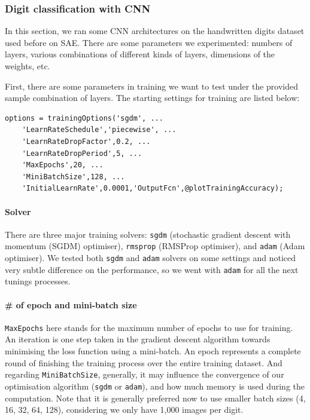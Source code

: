 \documentclass{article}
\begin{document}
\subsubsection{Digit classification with CNN}

In this section, we ran some CNN architectures on the handwritten digits dataset used before on SAE. There are some parameters we experimented: numbers of layers, various combinations of different kinds of layers, dimensions of the weights, etc.

First, there are some parameters in training we want to test under the provided sample combination of layers. The starting settings for training are listed below:

\begin{verbatim}
options = trainingOptions('sgdm', ...
    'LearnRateSchedule','piecewise', ...
    'LearnRateDropFactor',0.2, ...
    'LearnRateDropPeriod',5, ...
    'MaxEpochs',20, ...
    'MiniBatchSize',128, ...
    'InitialLearnRate',0.0001,'OutputFcn',@plotTrainingAccuracy);
\end{verbatim}

\paragraph{Solver}
There are three major training solvers: \verb|sgdm| (stochastic gradient descent with momentum (SGDM) optimiser), \verb|rmsprop| (RMSProp optimiser), and \verb|adam| (Adam optimiser). We tested both \verb|sgdm| and \verb|adam| solvers on some settings and noticed very subtle difference on the performance, so we went with \verb|adam| for all the next tunings processes.

\paragraph{\# of epoch and mini-batch size}
\verb|MaxEpochs| here stands for the maximum number of epochs to use for training. An iteration is one step taken in the gradient descent algorithm towards minimising the loss function using a mini-batch. An epoch represents a complete round of finishing the training process over the entire training dataset. And regarding \verb|MiniBatchSize|, generally, it may influence the convergence of our optimisation algorithm (\verb|sgdm| or \verb|adam|), and how much memory is used during the computation. Note that it is generally preferred now to use smaller batch sizes (4, 16, 32, 64, 128), considering we only have 1,000 images per digit. 
\end{document}
